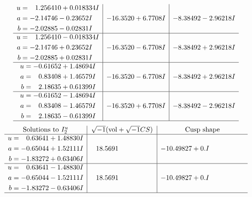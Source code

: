 \documentclass[1p]{elsarticle_modified}
\theoremstyle{definition}
\newcommand{\I}{\sqrt{-1}}
\begin{document}
$$\begin{array}{c|c|c}
\begin{aligned}
u &= \phantom{-}1.256410 + 0.018334 I \\
a &= -2.14746 - 0.23652 I \\
b &= -2.02885 - 0.02831 I\end{aligned}
 & -16.3520 + 6.7708 I & -8.38492 - 2.96218 I \\ \hline\begin{aligned}
u &= \phantom{-}1.256410 - 0.018334 I \\
a &= -2.14746 + 0.23652 I \\
b &= -2.02885 + 0.02831 I\end{aligned}
 & -16.3520 - 6.7708 I & -8.38492 + 2.96218 I \\ \hline\begin{aligned}
u &= -0.61652 + 1.48694 I \\
a &= \phantom{-}0.83408 + 1.46579 I \\
b &= \phantom{-}2.18635 + 0.61399 I\end{aligned}
 & -16.3520 - 6.7708 I & -8.38492 + 2.96218 I \\ \hline\begin{aligned}
u &= -0.61652 - 1.48694 I \\
a &= \phantom{-}0.83408 - 1.46579 I \\
b &= \phantom{-}2.18635 - 0.61399 I\end{aligned}
 & -16.3520 + 6.7708 I & -8.38492 - 2.96218 I\\
 \hline 
 \end{array}$$\newpage$$\begin{array}{c|c|c}  
\text{Solutions to }I^u_{2}& \I (\text{vol} + \sqrt{-1}CS) & \text{Cusp shape}\\
 \hline 
\begin{aligned}
u &= \phantom{-}0.63641 + 1.48830 I \\
a &= -0.65044 + 1.52111 I \\
b &= -1.83272 + 0.63406 I\end{aligned}
 & \phantom{-}18.5691\phantom{ +0.000000I} & -10.49827 + 0. I\phantom{ +0.000000I} \\ \hline\begin{aligned}
u &= \phantom{-}0.63641 - 1.48830 I \\
a &= -0.65044 - 1.52111 I \\
b &= -1.83272 - 0.63406 I\end{aligned}
 & \phantom{-}18.5691\phantom{ +0.000000I} & -10.49827 + 0. I\phantom{ +0.000000I}\\
 \hline 
 \end{array}$$\newpage\newpage\renewcommand{\arraystretch}{1}
\end{document}
